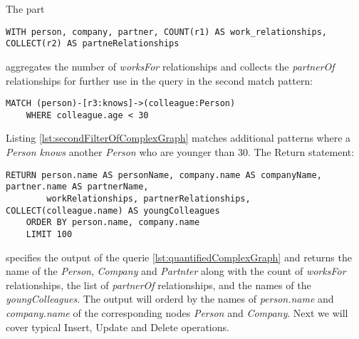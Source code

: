 The part
\begin{lstlisting}[caption={Aggregations and collections of complex quantified graph query}, label={lst:filterOfComplexGraph}]
	WITH person, company, partner, COUNT(r1) AS work_relationships, COLLECT(r2) AS partneRelationships
\end{lstlisting}
aggregates the number of \textit{worksFor} relationships and collects the 
\textit{partnerOf} relationships for further use in the query in the second match pattern:
\begin{lstlisting}[caption={Further matching of complex quantified graph query}, label={lst:secondFilterOfComplexGraph}]
	MATCH (person)-[r3:knows]->(colleague:Person)
	WHERE colleague.age < 30
\end{lstlisting}
Listing \ref{lst:secondFilterOfComplexGraph} matches additional patterns where a
\textit{Person knows} another \textit{Person} who are younger than 30.\clearpage
The Return statement:
\begin{lstlisting}[caption={Return statement of complex quantified graph query}, label={lst:returnOfComplexGraph}]
	RETURN person.name AS personName, company.name AS companyName, partner.name AS partnerName, 
		workRelationships, partnerRelationships, COLLECT(colleague.name) AS youngColleagues
	ORDER BY person.name, company.name
	LIMIT 100
\end{lstlisting}
specifies the output of the querie \ref{lst:quantifiedComplexGraph} and returns 
the name of the \textit{Person}, \textit{Company} and \textit{Partnter} along 
with the count of \textit{worksFor} relationships, the list of \textit{partnerOf} relationships,
and the names of the \textit{youngColleagues}. \newline
The output will orderd by the names of \textit{person.name} and \textit{company.name}
of the corresponding nodes \textit{Person} and \textit{Company}.
Next we will cover typical Insert, Update and Delete operations.

